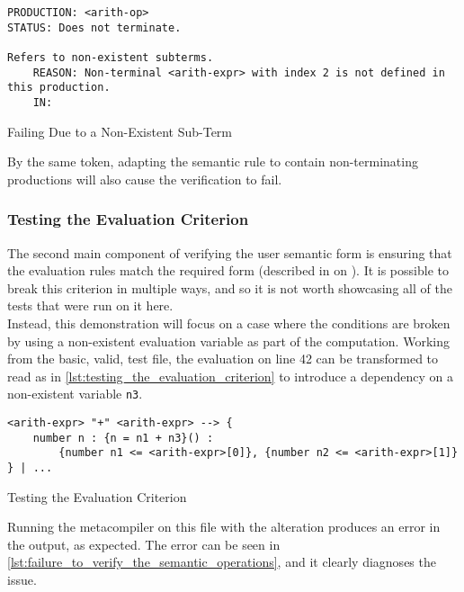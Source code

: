 \begin{listing}[!htb]
\begin{verbatim}
PRODUCTION: <arith-op>
STATUS: Does not terminate.

Refers to non-existent subterms.
    REASON: Non-terminal <arith-expr> with index 2 is not defined in this production.
    IN:
\end{verbatim}
\caption{Failing Due to a Non-Existent Sub-Term}
\label{lst:failing_due_to_a_non_existent_sub_term}
\end{listing}

By the same token, adapting the semantic rule to contain non-terminating productions will also cause the verification to fail.


\subsubsection{Testing the Evaluation Criterion} %
\label{ssub:testing_the_evaluation_criterion}
The second main component of verifying the user semantic form is ensuring that the evaluation rules match the required form (described in  on ).
It is possible to break this criterion in multiple ways, and so it is not worth showcasing all of the tests that were run on it here.\\

Instead, this demonstration will focus on a case where the conditions are broken by using a non-existent evaluation variable as part of the computation.
Working from the basic, valid, test file, the evaluation on line 42 can be transformed to read as in \autoref{lst:testing_the_evaluation_criterion} to introduce a dependency on a non-existent variable \texttt{n3}.

\begin{listing}[!htb]
\begin{verbatim}
<arith-expr> "+" <arith-expr> --> {
    number n : {n = n1 + n3}() :
        {number n1 <= <arith-expr>[0]}, {number n2 <= <arith-expr>[1]}
} | ...
\end{verbatim}
\caption{Testing the Evaluation Criterion}
\label{lst:testing_the_evaluation_criterion}
\end{listing}

Running the metacompiler on this file with the alteration produces an error in the output, as expected. 
The error can be seen in \autoref{lst:failure_to_verify_the_semantic_operations}, and it clearly diagnoses the issue. 

